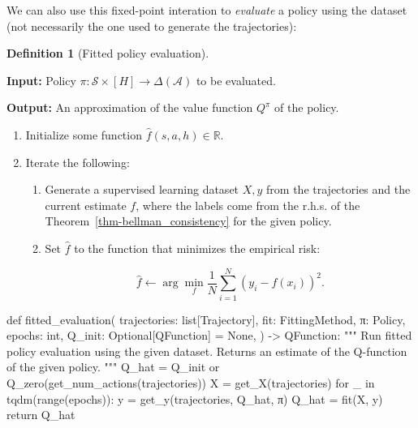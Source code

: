 \documentclass[
  letterpaper,
  DIV=11,
  numbers=noendperiod]{scrreprt}
\newenvironment{Shaded}{\begin{snugshade}}{\end{snugshade}}
\newcommand{\NormalTok}[1]{\textcolor[rgb]{0.00,0.23,0.31}{#1}}
\providecommand{\tightlist}{%
  \setlength{\itemsep}{0pt}\setlength{\parskip}{0pt}}\usepackage{longtable,booktabs,array}
\theoremstyle{plain}
\theoremstyle{plain}
\theoremstyle{definition}
\theoremstyle{definition}
\newtheorem{definition}{Definition}[chapter]
\theoremstyle{remark}
\begin{document}
We can also use this fixed-point interation to \emph{evaluate} a policy
using the dataset (not necessarily the one used to generate the
trajectories):

\begin{definition}[Fitted policy
evaluation]\protect\hypertarget{def-fitted_evaluation}{}\label{def-fitted_evaluation}

\textbf{Input:} Policy
\(\pi : \mathcal{S} \times [H] \to \Delta(\mathcal{A})\) to be
evaluated.

\textbf{Output:} An approximation of the value function \(Q^\pi\) of the
policy.

\begin{enumerate}
\def\labelenumi{\arabic{enumi}.}
\tightlist
\item
  Initialize some function \(\hat f(s, a, h) \in \mathbb{R}\).
\item
  Iterate the following:

  \begin{enumerate}
  \def\labelenumii{\arabic{enumii}.}
  \item
    Generate a supervised learning dataset \(X, y\) from the
    trajectories and the current estimate \(f\), where the labels come
    from the r.h.s. of the Theorem~\ref{thm-bellman_consistency} for the
    given policy.
  \item
    Set \(\hat f\) to the function that minimizes the empirical risk:

    \[\hat f \gets \arg\min_f \frac{1}{N} \sum_{i=1}^N (y_i - f(x_i))^2.\]
  \end{enumerate}
\end{enumerate}

\end{definition}

\begin{Shaded}
\begin{Highlighting}[]
\NormalTok{def fitted\_evaluation(}
\NormalTok{    trajectories: list[Trajectory],}
\NormalTok{    fit: FittingMethod,}
\NormalTok{    π: Policy,}
\NormalTok{    epochs: int,}
\NormalTok{    Q\_init: Optional[QFunction] = None,}
\NormalTok{) {-}\textgreater{} QFunction:}
\NormalTok{    """}
\NormalTok{    Run fitted policy evaluation using the given dataset.}
\NormalTok{    Returns an estimate of the Q{-}function of the given policy.}
\NormalTok{    """}
\NormalTok{    Q\_hat = Q\_init or Q\_zero(get\_num\_actions(trajectories))}
\NormalTok{    X = get\_X(trajectories)}
\NormalTok{    for \_ in tqdm(range(epochs)):}
\NormalTok{        y = get\_y(trajectories, Q\_hat, π)}
\NormalTok{        Q\_hat = fit(X, y)}
\NormalTok{    return Q\_hat}
\end{Highlighting}
\end{Shaded}
\end{document}
